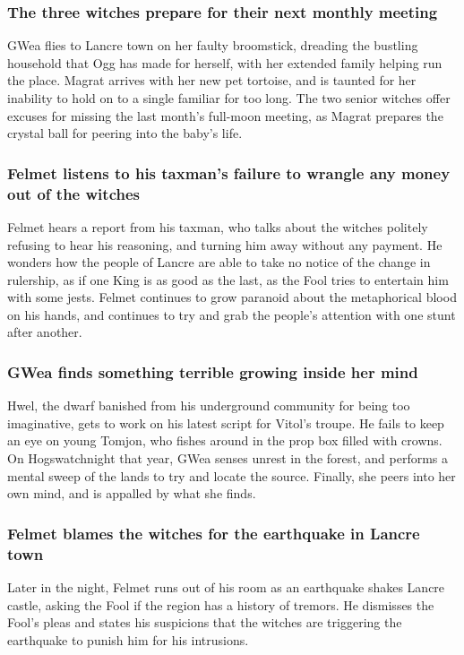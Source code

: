 \subsubsection{The three witches prepare for their next monthly meeting}
\Gls{GWea} flies to Lancre town on her faulty broomstick, dreading the bustling household that
\Gls{Ogg} has made for herself, with her extended family helping run the place. \Gls{Magrat} arrives
with her new pet tortoise, and is taunted for her inability to hold on to a single familiar for
too long. The two senior witches offer excuses for missing the last month's full-moon meeting, as
\Gls{Magrat} prepares the crystal ball for peering into the baby's life.

\subsubsection{\Gls{Felmet} listens to his taxman's failure to wrangle any money out of the witches}
\Gls{Felmet} hears a report from his taxman, who talks about the witches politely refusing to hear
his reasoning, and turning him away without any payment. He wonders how the people of Lancre are
able to take no notice of the change in rulership, as if one King is as good as the last, as the
\Gls{Fool} tries to entertain him with some jests. \Gls{Felmet} continues to grow paranoid about
the metaphorical blood on his hands, and continues to try and grab the people's attention with
one stunt after another.

\subsubsection{\Gls{GWea} finds something terrible growing inside her mind}
\Gls{Hwel}, the dwarf banished from his underground community for being too imaginative, gets to
work on his latest script for \Gls{Vitol}'s troupe. He fails to keep an eye on young \Gls{Tomjon},
who fishes around in the prop box filled with crowns. On Hogswatchnight that year, \Gls{GWea}
senses unrest in the forest, and performs a mental sweep of the lands to try and locate the source.
Finally, she peers into her own mind, and is appalled by what she finds.

\subsubsection{\Gls{Felmet} blames the witches for the earthquake in Lancre town}
Later in the night, \Gls{Felmet} runs out of his room as an earthquake shakes Lancre castle, asking
the \Gls{Fool} if the region has a history of tremors. He dismisses the \Gls{Fool}'s pleas and
states his suspicions that the witches are triggering the earthquake to punish him for his
intrusions.

